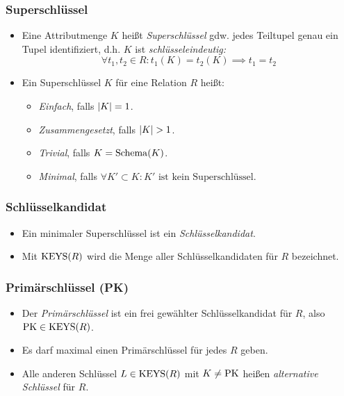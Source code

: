 		\subsubsection{Superschlüssel} %
			\begin{itemize}
				\item Eine Attributmenge \(K\) heißt \textit{Superschlüssel} gdw. jedes Teiltupel genau ein Tupel identifiziert, d.h. \(K\) ist \textit{schlüsseleindeutig:}
					\begin{equation*}
						\forall t_1, t_2 \in R : t_1(K) = t_2(K) \implies t_1 = t_2
					\end{equation*}
				\item Ein Superschlüssel \(K\) für eine Relation \(R\) heißt:
					\begin{itemize}
						\item \textit{Einfach}, falls \( \abs{K} = 1 \).
						\item \textit{Zusammengesetzt}, falls \( \abs{K} > 1 \).
						\item \textit{Trivial}, falls \(K = \operatorname{Schema}(K)\).
						\item \textit{Minimal}, falls \( \forall K' \subset K : K' \text{ ist kein Superschlüssel} \).
					\end{itemize}
			\end{itemize}

		\subsubsection{Schlüsselkandidat} %
			\begin{itemize}
				\item Ein minimaler Superschlüssel ist ein \textit{Schlüsselkandidat}.
				\item Mit \( \operatorname{KEYS}(R) \) wird die Menge aller Schlüsselkandidaten für \(R\) bezeichnet.
			\end{itemize}

		\subsubsection{Primärschlüssel (PK)} %
			\begin{itemize}
				\item Der \textit{Primärschlüssel} ist ein frei gewählter Schlüsselkandidat für \(R\), also \( \operatorname{PK} \in \operatorname{KEYS}(R) \).
				\item Es darf maximal einen Primärschlüssel für jedes \(R\) geben.
				\item Alle anderen Schlüssel \( L \in \operatorname{KEYS}(R) \) mit \( K \neq \operatorname{PK} \) heißen \textit{alternative Schlüssel} für \(R\).
			\end{itemize}

